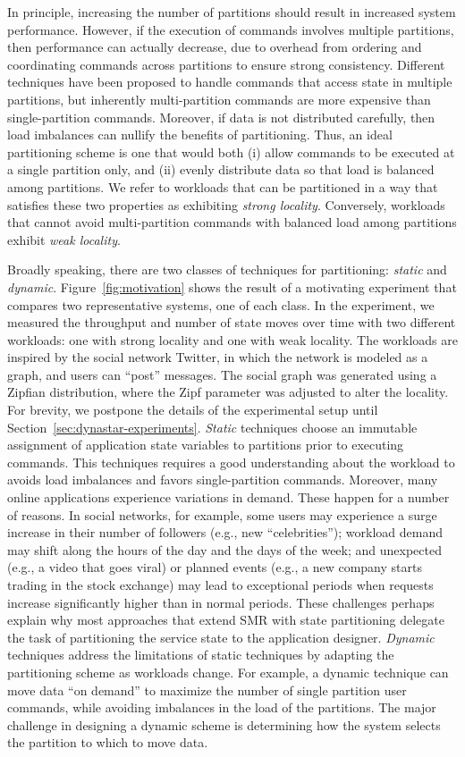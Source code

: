In principle, increasing the number of partitions should result in increased
system performance. However, if the execution of commands involves multiple
partitions, then performance can actually decrease, due to overhead from
ordering and coordinating commands across partitions to ensure strong
consistency. Different techniques have been proposed to handle commands that
access state in multiple partitions, but inherently multi-partition commands are
more expensive than single-partition commands. Moreover, if data is not
distributed carefully, then load imbalances can nullify the benefits of
partitioning. Thus, an ideal partitioning scheme is one that would both (i)
allow commands to be executed at a single partition only, and (ii) evenly
distribute data so that load is balanced among partitions. We refer to workloads
that can be partitioned in a way that satisfies these two properties as
exhibiting \emph{strong locality}. Conversely, workloads that cannot avoid
multi-partition commands with balanced load among partitions exhibit \emph{weak
locality}.

Broadly speaking, there are two classes of techniques for partitioning:
\emph{static} and \emph{dynamic}. Figure~\ref{fig:motivation} shows the result
of a motivating experiment that compares two representative systems, one of each
class. In the experiment, we measured the throughput and number of state moves
over time with two different workloads: one with strong locality and one with
weak locality. The workloads are inspired by the social network Twitter, in
which the network is modeled as a graph, and users can ``post'' messages. The
social graph was generated using a Zipfian distribution, where the Zipf
parameter was adjusted to alter the locality.  For brevity, we postpone the
details of the experimental setup until Section~\ref{sec:dynastar-experiments}.
\emph{Static} techniques choose an immutable assignment of application state
variables to partitions prior to executing commands. This techniques requires a
good understanding about the workload to avoids load imbalances and favors
single-partition commands.  Moreover, many online applications experience
variations in demand. These happen for a number of reasons. In social networks,
for example, some users may experience a surge increase in their number of
followers (e.g., new ``celebrities''); workload demand may shift along the hours
of the day and the days of the week; and unexpected (e.g., a video that goes
viral) or planned events (e.g., a new company starts trading in the stock
exchange) may lead to exceptional periods when requests increase significantly
higher than in normal periods. These challenges perhaps explain why most
approaches that extend SMR with state partitioning delegate the task of
partitioning the service state to the application designer. \emph{Dynamic}
techniques address the limitations of static techniques by adapting the
partitioning scheme as workloads change. For example, a dynamic technique can
move data ``on demand'' to maximize the number of single partition user
commands, while avoiding imbalances in the load of the partitions. The major
challenge in designing a dynamic scheme is determining how the system selects
the partition to which to move data.



